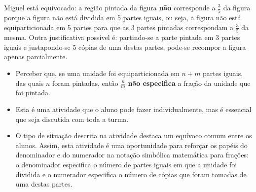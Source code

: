 \begin{multicols}{2}
\begin{orientacoes}
\end{orientacoes}

\begin{solucao}{}{}
Miguel está equivocado: a região pintada da figura   {\bf não}   corresponde a   $\frac{3}{5}$ da figura porque a figura não está dividida em 5 partes iguais, ou seja, a figura não está equiparticionada em 5 partes para que as 3 partes pintadas correspondam a   $\frac{3}{5}$ da mesma. Outra justificativa possível é: partindo-se a parte pintada em 3 partes iguais e justapondo-se 5 cópias de uma destas partes, pode-se recompor a figura apenas parcialmente.

\end{solucao}



\begin{objetivos}{}{}
  \begin{itemize} %
    \item       Perceber que, se uma unidade foi equiparticionada em       $n + m$ partes iguais, das quais       $n$ foram pintadas, então       $\frac{n}{m}$     {\bf não especifica}       a fração da unidade que foi pintada.
\end{itemize} %
\end{objetivos}

\begin{orientacoes}
\begin{itemize} %
    \item       Esta é uma atividade que o aluno pode fazer individualmente, mas é essencial que seja discutida com toda a turma.
    \item       O tipo de situação descrita na atividade destaca um equívoco comum entre os alunos. Assim, esta atividade é uma oportunidade para reforçar os papéis do denominador e do numerador na notação simbólica matemática para frações: o denominador especifica o número de partes iguais em que a unidade foi dividida e o numerador especifica o número de cópias que foram tomadas de uma destas partes.
\end{itemize} %


\end{orientacoes}
\end{multicols}
